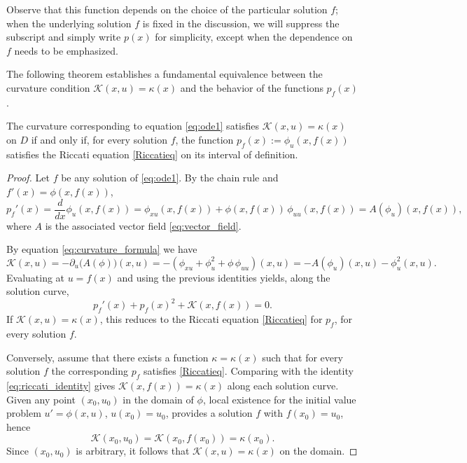 \documentclass[preprint,a4paper]{elsarticle}
\begin{document}
Observe that this function depends on the choice of the particular solution $f$; when the underlying solution $f$ is fixed in the discussion, we will suppress the subscript and simply write $p(x)$ for simplicity, except when the dependence on $f$ needs to be emphasized.

The following theorem establishes a fundamental equivalence between the curvature condition $\mathcal{K}(x,u) = \kappa(x)$ and the behavior of the functions $p_f(x)$.

\begin{theorem}\label{thm:riccati_connection}
The curvature corresponding to equation \eqref{eq:ode1} satisfies $\mathcal{K}(x,u)=\kappa(x)$ on $D$ if and only if, for every solution $f$, the function $p_f(x):=\phi_u(x,f(x))$ satisfies the Riccati equation \eqref{Riccatieq} on its interval of definition.
\end{theorem}

\begin{proof}%
Let $f$ be any solution of \eqref{eq:ode1}. By the chain rule and $f'(x)=\phi(x,f(x))$,
\[
p_f'(x)=\frac{d}{dx}\phi_u(x,f(x))=\phi_{xu}(x,f(x))+\phi(x,f(x))\,\phi_{uu}(x,f(x))=A(\phi_u)(x,f(x)),
\]
where $A$ is the associated vector field \eqref{eq:vector_field}.


By equation \eqref{eq:curvature_formula} we have
\[
\mathcal{K}(x,u)=-\partial_u\bigl(A(\phi)\bigr)(x,u)=-(\phi_{xu}+\phi_u^{2}+\phi\,\phi_{uu})(x,u)=-A(\phi_u)(x,u)-\phi_u^2(x,u). %
\]
Evaluating at $u=f(x)$ and using the previous identities yields, along the solution curve,
\begin{equation}\label{eq:riccati_identity}
p_f'(x)+p_f(x)^2+\mathcal{K}(x,f(x))=0.
\end{equation}
If $\mathcal{K}(x,u)=\kappa(x)$, this reduces to the Riccati equation \eqref{Riccatieq} for $p_f$, for every solution $f$.

Conversely, assume that there exists a function $\kappa=\kappa(x)$ such that for every solution $f$ the corresponding $p_f$ satisfies \eqref{Riccatieq}. Comparing with the identity \eqref{eq:riccati_identity} gives $\mathcal{K}(x,f(x))=\kappa(x)$ along each solution curve. Given any point $(x_0,u_0)$ in the domain of $\phi$, local existence for the initial value problem $u'=\phi(x,u)$, $u(x_0)=u_0$, provides a solution $f$ with $f(x_0)=u_0$, hence
\[
\mathcal{K}(x_0,u_0)=\mathcal{K}(x_0,f(x_0))=\kappa(x_0).
\]
Since $(x_0,u_0)$ is arbitrary, it follows that $\mathcal{K}(x,u)=\kappa(x)$ on the domain.
\end{proof}
\end{document}
